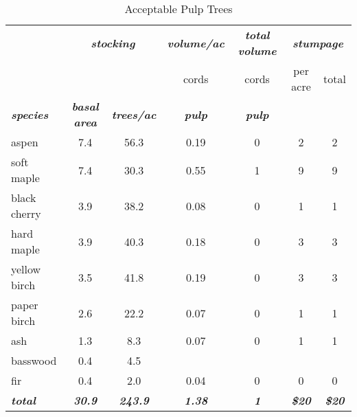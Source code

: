 \documentclass[landscape]{article}
\begin{document}
\begin{table}[H]

\caption{\label{tab:unnamed-chunk-42}Acceptable Pulp Trees}
\fontsize{10}{12}\selectfont
\begin{tabular}[t]{lcccccc}
\toprule
\multicolumn{1}{c}{\em{\textbf{ }}} & \multicolumn{2}{c}{\em{\textbf{stocking}}} & \multicolumn{1}{c}{\em{\textbf{volume/ac }}} & \multicolumn{1}{c}{\em{\textbf{total volume}}} & \multicolumn{2}{c}{\em{\textbf{stumpage}}} \\
\cmidrule(l{3pt}r{3pt}){2-3} \cmidrule(l{3pt}r{3pt}){4-4} \cmidrule(l{3pt}r{3pt}){5-5} \cmidrule(l{3pt}r{3pt}){6-7}
\multicolumn{3}{c}{ } & \multicolumn{1}{c}{cords} & \multicolumn{1}{c}{cords} & \multicolumn{1}{c}{per acre} & \multicolumn{1}{c}{total} \\
\cmidrule(l{3pt}r{3pt}){4-4} \cmidrule(l{3pt}r{3pt}){5-5} \cmidrule(l{3pt}r{3pt}){6-6} \cmidrule(l{3pt}r{3pt}){7-7}
\rowcolor[HTML]{DCDCDC}  \em{\textbf{species}} & \em{\textbf{basal area}} & \em{\textbf{trees/ac}} & \em{\textbf{pulp}} & \em{\textbf{pulp}} & \em{\textbf{ }} & \em{\textbf{ }}\\
\midrule
\rowcolor{gray!6}  aspen & 7.4 & 56.3 & 0.19 & 0 & 2 & 2\\
 
soft maple & 7.4 & 30.3 & 0.55 & 1 & 9 & 9\\
 
\rowcolor{gray!6}  black cherry & 3.9 & 38.2 & 0.08 & 0 & 1 & 1\\
 
hard maple & 3.9 & 40.3 & 0.18 & 0 & 3 & 3\\
 
\rowcolor{gray!6}  yellow birch & 3.5 & 41.8 & 0.19 & 0 & 3 & 3\\
 
paper birch & 2.6 & 22.2 & 0.07 & 0 & 1 & 1\\
 
\rowcolor{gray!6}  ash & 1.3 & 8.3 & 0.07 & 0 & 1 & 1\\
 
basswood & 0.4 & 4.5 &  &  &  & \\
 
\rowcolor{gray!6}  fir & 0.4 & 2.0 & 0.04 & 0 & 0 & 0\\
 
\rowcolor[HTML]{DCDCDC}  \em{\textbf{total}} & \em{\textbf{30.9}} & \em{\textbf{243.9}} & \em{\textbf{1.38}} & \em{\textbf{1}} & \em{\textbf{\$20}} & \em{\textbf{\$20}}\\
\bottomrule
\end{tabular}
\end{table}
\end{document}
